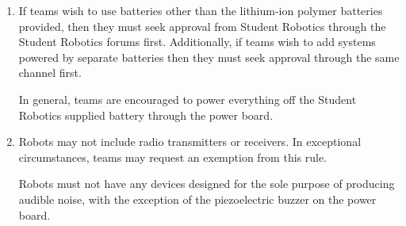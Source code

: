 \begin{enumerate}
\item If teams wish to use batteries other than the lithium-ion polymer batteries provided,
       then they must seek approval from Student Robotics through the Student Robotics forums first.
      Additionally, if teams wish to add systems powered by separate batteries then they must seek approval through the same channel first.

      In general, teams are encouraged to power everything off the Student Robotics supplied battery through the power board.

\item Robots may not include radio transmitters or receivers.
      In exceptional circumstances, teams may request an exemption from this rule.

\items Robots must not have any devices designed for the sole purpose of producing audible noise, with the exception of the piezoelectric buzzer on the power board.

\end{enumerate}
